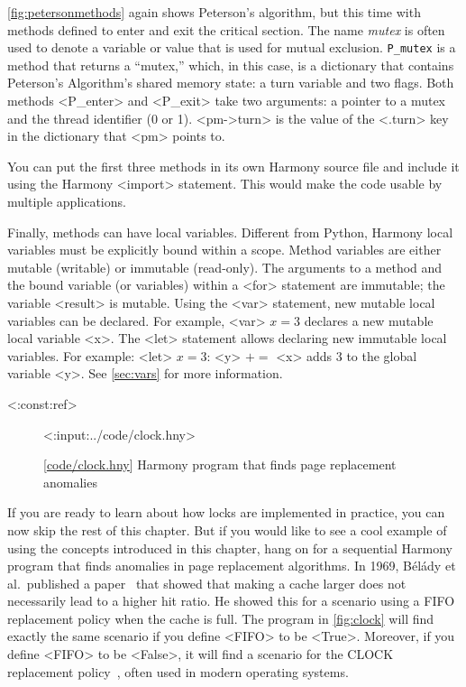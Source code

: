 \documentclass{report}
\newcommand{\harmonylink}[1]{%
[\href{https://harmony.cs.cornell.edu/#1}{\underline{#1}}]%
}
\newenvironment{code}{
\tcolorbox
}{
\endtcolorbox
}
\begin{document}
\autoref{fig:petersonmethods} again shows Peterson's algorithm,
but this time with methods defined to enter and exit the critical
section.
The name \textit{mutex} is often used to denote a variable or value
that is used for mutual exclusion.
\texttt{P\_mutex} is a method that returns a ``mutex,'' which, in this
case, is a dictionary that contains Peterson's Algorithm's shared memory state:
a turn variable and two flags.
Both methods <{P_enter}> and <{P_exit}> take two arguments:
a pointer to a mutex and the thread identifier (0 or 1).
<{pm->turn}> is the value of the <{.turn}> key
in the dictionary that <{pm}> points to. 

You can put the first three methods in its own Harmony source file
and include it using the Harmony <{import}> statement.
%
%
This would make the code usable by multiple applications.

Finally, methods can have local variables.
Different from Python, Harmony local variables must be
explicitly bound within a scope.
Method variables are either mutable (writable) or immutable (read-only).
The arguments to a method and the bound variable (or
variables) within a <{for}> statement are immutable;
the variable <{result}> is mutable.
Using the <{var}> statement, new mutable local variables can be
declared.
For example, <{var}> $x = 3$ declares a new mutable local variable
<{x}>.
The <{let}> statement allows declaring new immutable local variables.
For example:
<{let}> $x = 3$: <{y}> $+$$=$ <{x}> adds 3 to the global variable
<{y}>.
See \autoref{sec:vars} for more information.

<{:const:ref}>

\begin{figure}
\begin{code}
<{:input:../code/clock.hny}>
\end{code}
\caption{\harmonylink{code/clock.hny} Harmony program that finds page replacement anomalies}
\label{fig:clock}
\end{figure}

If you are ready to learn about how locks are implemented in practice,
you can now skip the rest of this chapter.  But if you would like to
see a cool example of using the concepts introduced in this chapter,
hang on for a sequential Harmony program that finds anomalies in page
replacement algorithms.
In 1969, B\'{e}l\'{a}dy et al.~published a paper~\cite{Belady69}
that showed that making a
cache larger does not necessarily lead to a higher hit ratio.  He showed
this for a scenario using a FIFO replacement policy when the cache is full. 
The program in \autoref{fig:clock} will find exactly the same scenario
if you define <{FIFO}> to be <{True}>.  Moreover, if you define
<{FIFO}> to be <{False}>, it will find a scenario for the
CLOCK replacement policy~\cite{clock}, often used in modern operating systems.
\end{document}
